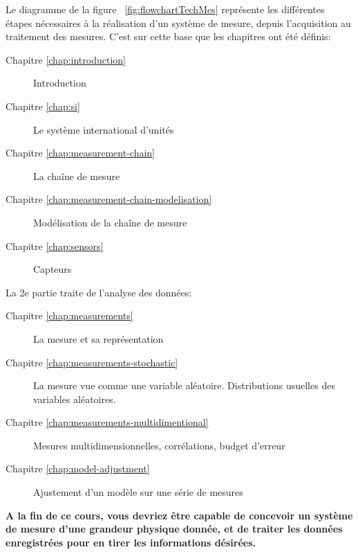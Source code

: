 Le diagramme de la figure  ~\ref{fig:flowchartTechMes} représente les différentes étapes nécessaires à la réalisation d'un système de mesure, depuis l'acquisition au traitement des mesures. C'est sur cette base que les chapitres ont été définis:

\begin{description}
   \item[Chapitre \ref{chap:introduction}] Introduction
   \item[Chapitre \ref{chap:si}] Le système international d'unités
   \item[Chapitre \ref{chap:measurement-chain}] La chaîne de mesure
   \item[Chapitre \ref{chap:measurement-chain-modelisation}] Modélisation de la chaîne de mesure
   \item[Chapitre \ref{chap:sensors}] Capteurs
\end{description}

La 2e partie traite de l'analyse des données:

\begin{description}
\item[Chapitre \ref{chap:measurements}] La mesure et sa représentation
\item[Chapitre \ref{chap:measurements-stochastic}] La mesure vue comme une variable aléatoire. Distributions usuelles des
variables aléatoires.
\item[Chapitre \ref{chap:measurements-multidimentional}] Mesures multidimensionnelles, corrélations, budget d'erreur
\item[Chapitre \ref{chap:model-adjustment}] Ajustement d'un modèle sur une série de mesures
\end{description}

\textbf{A la fin de ce cours, vous devriez être capable de concevoir un système de mesure d'une grandeur physique donnée, et de traiter les données enregistrées pour en tirer les informations désirées.}
